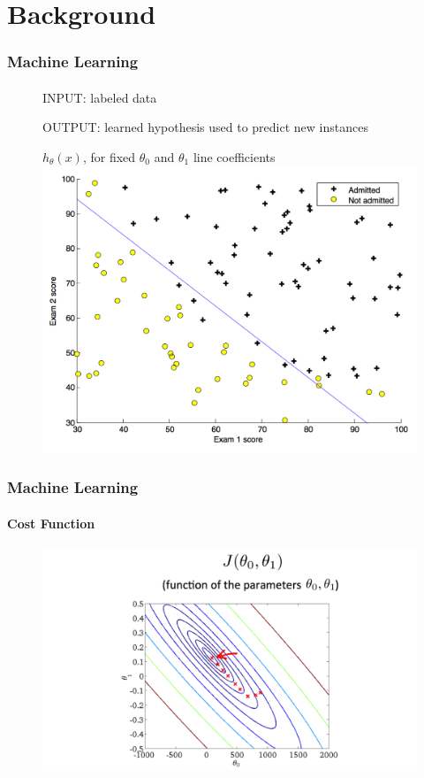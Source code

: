 \documentclass{beamer}
\begin{document}
\section{Background}
\begin{frame}
    \frametitle{Machine Learning}
    \framesubtitle{}
    \begin{figure}[!htb]
        \begin{flushleft}
        \par INPUT: labeled data
        \par OUTPUT: learned hypothesis used to predict new instances
        \end{flushleft}
        \centering
        \par $h_\theta(x)$, for fixed $\theta_0$ and $\theta_1$ line coefficients
    \includegraphics[width=0.70\columnwidth]{fig/ML_labels}
        \label{fig:ML_labels}
    \end{figure}
\end{frame}
\begin{frame}
    \frametitle{Machine Learning}
    \framesubtitle{Cost Function}
    \begin{figure}[!htb]
        \centering
    \includegraphics[width=1.0\columnwidth]{fig/ML2}
        \label{fig:ML2}
    \end{figure}
\end{frame}
\end{document}
